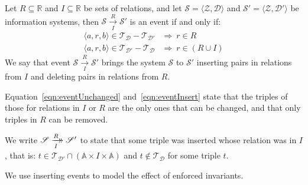 \documentclass[runningheads]{llncs}
\newcommand{\xrightarrowdbl}[2][]{%
  \xrightarrow[#1]{#2}\mathrel{\mkern-14mu}\rightarrow
}
\newcommand{\pair}[2]{\langle{#1},{#2}\rangle}
\newcommand{\triple}[3]{\langle{#1},{#2},{#3}\rangle}
\newcommand{\Atoms}{\mathbb{A}}
\newcommand{\Rels}{\mathbb{R}}   %
\newcommand{\triples}{\mathcal{T}}
\newcommand{\Triple}[3]{#1\times#2\times#3}
\newcommand{\dataset}{\mathscr{D}}
\newcommand{\schema}{\mathscr{Z}}
\newcommand{\infsys}{\mathscr{S}}
\begin{document}
\begin{definition}[Event]
   Let $R \subseteq \Rels$ and $I \subseteq \Rels$ be sets of relations,
   and let $\infsys=\pair{\schema}{\dataset}$ and  $\infsys'=\pair{\schema}{\dataset'}$ be information systems,
   then $\infsys\xrightarrow[I]{R} \infsys'$ is an event if and only if:
   \begin{align}
      \triple{a}{r}{b}\in\triples_{\dataset}-\triples_{\dataset'}&\Rightarrow\ r\in R
   \label{eqn:eventUnchanged}\\
      \triple{a}{r}{b}\in\triples_{\dataset'}-\triples_{\dataset}&\Rightarrow\ r\in(R \cup I)
   \label{eqn:eventInsert}
   \end{align}
   We say that event $\infsys\xrightarrow[I]{R} \infsys'$ brings the system $\infsys$ to $\infsys'$ inserting pairs in relations from $I$ and deleting pairs in relations from $R$.
\end{definition}
   
   Equation~\ref{eqn:eventUnchanged} and~\ref{eqn:eventInsert} state that the triples of those for relations in $I$ or $R$ are the only ones that can be changed, and that only triples in $R$ can be removed.
   
\begin{definition}
   We write $\infsys \xrightarrowdbl[I]{R} \infsys'$ to state that some triple was inserted whose relation was in $I$, that is:
   $t \in \triples_{\dataset'} \cap (\Triple{\Atoms}{I}{\Atoms})$ and $t \not\in \triples_{\dataset}$ for some triple $t$.
\end{definition}
   
   We use inserting events to model the effect of enforced invariants.
\end{document}
